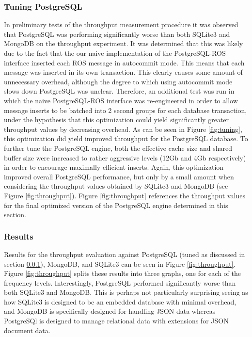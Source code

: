 \documentclass[nocopyrightspace]{acm_proc_article-sp}
\begin{document}
\subsubsection{Tuning PostgreSQL}
\label{sec:tuning}
In preliminary tests of the throughput measurement procedure it was observed that PostgreSQL was performing significantly worse than both SQLite3 and MongoDB on the throughput experiment. It was determined that this was likely due to the fact that the our naive implementation of the PostgreSQL-ROS interface inserted each ROS message in autocommit mode. This means that each message was inserted in its own transaction. This clearly causes some amount of unnecessary overhead, although the degree to which using autocommit mode slows down PostgreSQL was unclear. Therefore, an additional test was run in which the naive PostgreSQL-ROS interface was re-engineered in order to allow message inserts to be batched into 2 second groups for each database transaction, under the hypothesis that this optimization could yield significantly greater throughput values by decreasing overhead. As can be seen in Figure \ref{fig:tuning}, this optimization did yield improved throughput for the PostgreSQL database. To further tune the PostgreSQL engine, both the effective cache size and shared buffer size were increased to rather aggressive levels (12Gb and 4Gb respectively) in order to encourage maximally efficient inserts. Again, this optimization improved overall PostgreSQL performance, but only by a small amount when considering the throughput values obtained by SQLite3 and MongoDB (see Figure \ref{fig:throughput}). Figure \ref{fig:throughput} references the throughput values for the final optimized version of the PostgreSQL engine determined in this section.


\subsubsection{Results}
Results for the throughput evaluation against PostgreSQL (tuned as discussed in section \ref{sec:tuning}), MongoDB, and SQLite3 can be seen in Figure \ref{fig:throughput}. Figure \ref{fig:throughput} splits these results into three graphs, one for each of the frequency levels. Interestingly, PostgreSQL performed significantly worse than both SQLite3 and MongoDB. This is perhaps not particularly surprising seeing as how SQLite3 is designed to be an embedded database with minimal overhead, and MongoDB is specifically designed for handling JSON data whereas PostgreSQl is designed to manage relational data with extensions for JSON document data.
\end{document}

